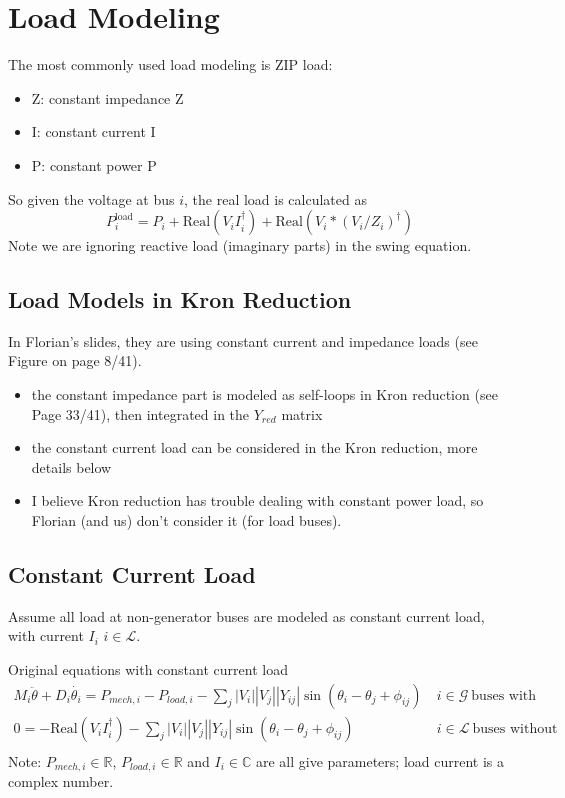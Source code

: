 \documentclass[a4paper,11pt]{article}
\begin{document}
\section{Load Modeling} %
\label{sec:load_modeling}
The most commonly used load modeling is ZIP load:
\begin{itemize}
\item Z: constant impedance Z
\item I: constant current I
\item P: constant power P
\end{itemize}
So given the voltage at bus $i$, the real load is calculated as
\begin{equation}
P^{\text{load}}_i = P_i + \text{Real}(V_i I_i^\dagger) + \text{Real}(V_i * (V_i/Z_i)^\dagger)
\end{equation}
Note we are ignoring reactive load (imaginary parts) in the swing equation.

\subsection{Load Models in Kron Reduction} %
In Florian's slides, they are using constant current and impedance loads (see Figure on page 8/41).
\begin{itemize}
\item the constant impedance part is modeled as self-loops in Kron reduction (see Page 33/41), then integrated in the $Y_{red}$ matrix
\item the constant current load can be considered in the Kron reduction, more details below
\item I believe Kron reduction has trouble dealing with constant power load, so Florian (and us) don't consider it (for load buses).
\end{itemize}


\subsection{Constant Current Load} %
\label{sub:constant_current_load}
Assume all load at non-generator buses are modeled as constant current load, with current $I_i$ $i \in \mathcal{L}$. 

Original equations with constant current load
\begin{subequations}
\begin{eqnarray}
M_i \ddot{\theta} + D_i \dot{\theta_i} = P_{mech,i} - P_{load,i} - \sum_{j} |V_i| |V_j| |Y_{ij}| \sin(\theta_i - \theta_j + \phi_{ij}) &~ i \in \mathcal{G}~\text{buses with generators} \\
0 = - \text{Real}(V_i I_i^\dagger) - \sum_{j} |V_i| |V_j| |Y_{ij}| \sin(\theta_i - \theta_j + \phi_{ij}) &~ i \in \mathcal{L}~\text{buses without generators} \\
\end{eqnarray}
\end{subequations}
Note: $P_{mech,i} \in \mathbb{R}$, $P_{load,i} \in \mathbb{R}$ and $I_i \in \mathbb{C}$ are all give parameters; load current is a complex number. 
\end{document}
